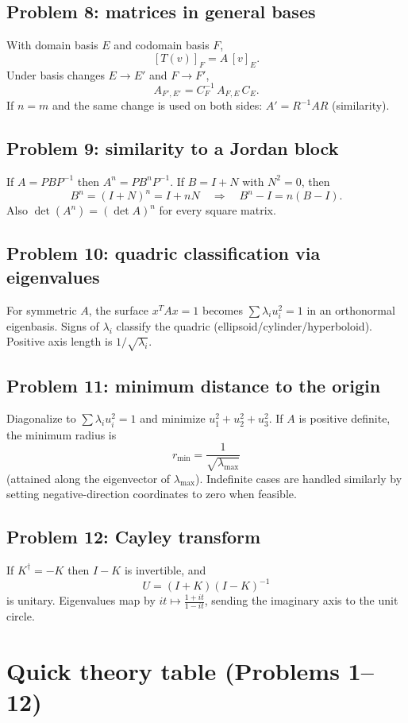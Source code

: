 \documentclass[12pt,a4paper]{article}
\theoremstyle{plain}
\theoremstyle{definition}      %
\begin{document}
\subsection*{Problem 8: matrices in general bases}
With domain basis $E$ and codomain basis $F$,
\[
[T(v)]_F = A\,[v]_E.
\]
Under basis changes $E\to E'$ and $F\to F'$,
\[
A_{F',E'} = C_F^{-1}\,A_{F,E}\,C_E.
\]
If $n=m$ and the same change is used on both sides: $A'=R^{-1}AR$ (similarity).

\subsection*{Problem 9: similarity to a Jordan block}
If $A=PBP^{-1}$ then $A^n=PB^nP^{-1}$. If $B=I+N$ with $N^2=0$, then
\[
B^n=(I+N)^n = I+nN \quad\Rightarrow\quad B^n-I=n(B-I).
\]
Also $\det(A^n)=(\det A)^n$ for every square matrix.

\subsection*{Problem 10: quadric classification via eigenvalues}
For symmetric $A$, the surface $x^TAx=1$ becomes $\sum \lambda_i u_i^2=1$ in an orthonormal eigenbasis.
Signs of $\lambda_i$ classify the quadric (ellipsoid/cylinder/hyperboloid). Positive axis length is $1/\sqrt{\lambda_i}$.

\subsection*{Problem 11: minimum distance to the origin}
Diagonalize to $\sum \lambda_i u_i^2=1$ and minimize $u_1^2+u_2^2+u_3^2$.
If $A$ is positive definite, the minimum radius is
\[
r_{\min}=\frac{1}{\sqrt{\lambda_{\max}}}
\]
(attained along the eigenvector of $\lambda_{\max}$). Indefinite cases are handled similarly by setting
negative-direction coordinates to zero when feasible.

\subsection*{Problem 12: Cayley transform}
If $K^\dagger=-K$ then $I-K$ is invertible, and
\[
U=(I+K)(I-K)^{-1}
\]
is unitary. Eigenvalues map by $it\mapsto \frac{1+it}{1-it}$, sending the imaginary axis to the unit circle.

\section*{Quick theory table (Problems 1--12)}
\end{document}
